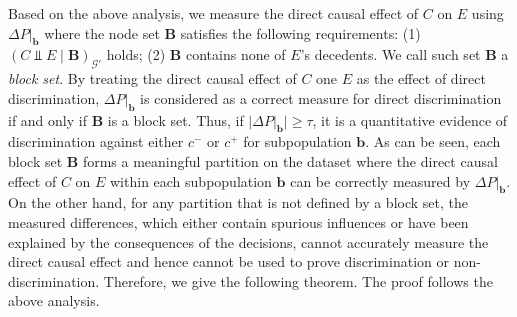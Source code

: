 \documentclass[twoside,leqno,twocolumn]{article}
\begin{document}

Based on the above analysis, we measure the direct causal effect of $C$ on $E$ using $\Delta P|_{\mathbf{b}}$ where the node set $\mathbf{B}$ satisfies the following requirements: (1) $(C\Perp E \mid \mathbf{B})_{\mathcal{G}'}$ holds; (2) $\mathbf{B}$ contains none of $E$'s decedents. We call such set $\mathbf{B}$ a \emph{block set}. %
By treating the direct causal effect of $C$ one $E$ as the effect of direct discrimination, $\Delta P|_{\mathbf{b}}$ is considered as a correct measure for direct discrimination if and only if $\mathbf{B}$ is a block set. Thus, if $|\Delta P|_{\mathbf{b}}|\geq \tau$, it is a quantitative evidence of discrimination against either $c^{-}$ or $c^{+}$ for subpopulation $\mathbf{b}$. As can be seen, each block set $\mathbf{B}$ forms a meaningful partition on the dataset where the direct causal effect of $C$ on $E$ within each subpopulation $\mathbf{b}$ can be correctly measured by $\Delta P|_{\mathbf{b}}$. On the other hand, for any partition that is not defined by a block set, the measured differences, which either contain spurious influences or have been explained by the consequences of the decisions, cannot accurately measure the direct causal effect and hence cannot be used to prove discrimination or non-discrimination. Therefore, we give the following theorem. The proof follows the above analysis.
\end{document}
